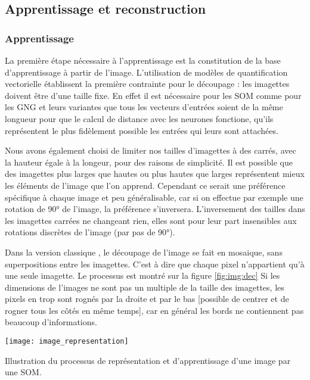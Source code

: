 	\subsection{Apprentissage et reconstruction}\label{sec:img:compression}
	\subsubsection{Apprentissage}
	La première étape nécessaire à l'apprentissage est la constitution de la base d'apprentissage à partir de l'image. L'utilisation de modèles de quantification vectorielle établissent la première contrainte pour le découpage : les imagettes doivent être d'une taille fixe. En effet il est nécessaire pour les SOM comme pour les GNG et leurs variantes que tous les vecteurs d'entrées soient de la même longueur pour que le calcul de distance avec les neurones fonctione, qu'ils représentent le plus fidèlement possible les entrées qui leurs sont attachées.

	Nous avons également choisi de limiter nos tailles d'imagettes à des carrés, avec la hauteur égale à la longeur, pour des raisons de simplicité. Il est possible que des imagettes plus larges que hautes ou plus hautes que larges représentent mieux les éléments de l'image que l'on apprend. Cependant ce serait une préférence spécifique à chaque image et peu généralisable, car si on effectue par exemple une rotation de 90° de l'image, la préférence s'inversera. L'inversement des tailles dans les imagettes carrées ne changeant rien, elles sont pour leur part insensibles aux rotations discrètes de l'image (par pas de 90°).

	Dans la version classique \cite{amerijckx-compression}, le découpage de l'image se fait en mosaique, sans superpositions entre les imagettes. C'est à dire que chaque pixel n'appartient qu'à une seule imagette. Le processus est montré sur la figure \ref{fig:img:dec} Si les dimensions de l'images ne sont pas un multiple de la taille des imagettes, les pixels en trop sont rognés par la droite et par le bas [possible de centrer et de rogner tous les côtés en même temps], car en général les bords ne contiennent pas beaucoup d'informations.

	\begin{figureth}
		\texttt{[image: image\_representation]}
		\caption[Représentation d'une image]{Illustration du processus de représentation et d'apprentissage d'une image par une SOM.}\label{fig:img:dec}
	\end{figureth}

